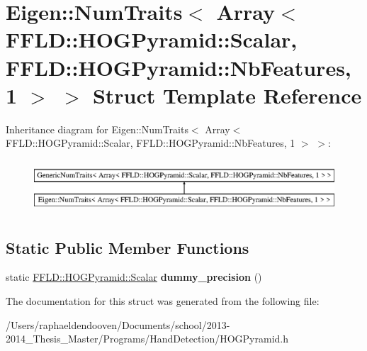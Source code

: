 \hypertarget{struct_eigen_1_1_num_traits_3_01_array_3_01_f_f_l_d_1_1_h_o_g_pyramid_1_1_scalar_00_01_f_f_l_d_179908bda57298c5a601e3a022e5c08f1}{\section{Eigen\-:\-:Num\-Traits$<$ Array$<$ F\-F\-L\-D\-:\-:H\-O\-G\-Pyramid\-:\-:Scalar, F\-F\-L\-D\-:\-:H\-O\-G\-Pyramid\-:\-:Nb\-Features, 1 $>$ $>$ Struct Template Reference}
\label{struct_eigen_1_1_num_traits_3_01_array_3_01_f_f_l_d_1_1_h_o_g_pyramid_1_1_scalar_00_01_f_f_l_d_179908bda57298c5a601e3a022e5c08f1}
}
Inheritance diagram for Eigen\-:\-:Num\-Traits$<$ Array$<$ F\-F\-L\-D\-:\-:H\-O\-G\-Pyramid\-:\-:Scalar, F\-F\-L\-D\-:\-:H\-O\-G\-Pyramid\-:\-:Nb\-Features, 1 $>$ $>$\-:\begin{figure}[H]
\begin{center}
\leavevmode
\includegraphics[height=1.978799cm]{struct_eigen_1_1_num_traits_3_01_array_3_01_f_f_l_d_1_1_h_o_g_pyramid_1_1_scalar_00_01_f_f_l_d_179908bda57298c5a601e3a022e5c08f1}
\end{center}
\end{figure}
\subsection*{Static Public Member Functions}
\begin{DoxyCompactItemize}
\item 
\hypertarget{struct_eigen_1_1_num_traits_3_01_array_3_01_f_f_l_d_1_1_h_o_g_pyramid_1_1_scalar_00_01_f_f_l_d_179908bda57298c5a601e3a022e5c08f1_af17f381194aecb89e1c136d2ee408d64}{static \hyperlink{class_f_f_l_d_1_1_h_o_g_pyramid_af17c08ed86557e0a0aecb4814daf87c3}{F\-F\-L\-D\-::\-H\-O\-G\-Pyramid\-::\-Scalar} {\bfseries dummy\-\_\-precision} ()}\label{struct_eigen_1_1_num_traits_3_01_array_3_01_f_f_l_d_1_1_h_o_g_pyramid_1_1_scalar_00_01_f_f_l_d_179908bda57298c5a601e3a022e5c08f1_af17f381194aecb89e1c136d2ee408d64}

\end{DoxyCompactItemize}


The documentation for this struct was generated from the following file\-:\begin{DoxyCompactItemize}
\item 
/\-Users/raphaeldendooven/\-Documents/school/2013-\/2014\-\_\-\-Thesis\-\_\-\-Master/\-Programs/\-Hand\-Detection/H\-O\-G\-Pyramid.\-h\end{DoxyCompactItemize}
